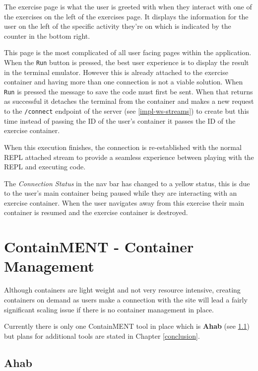 The exercise page is what the user is greeted with when they interact with one of the exercises on the left of the exercises page. It displays the information for the user on the left of the specific activity they're on which is indicated by the counter in the bottom right. 

This page is the most complicated of all user facing pages within the application. When the \texttt{Run} button is pressed, the best user experience is to display the result in the terminal emulator. However this is already attached to the exercise container and having more than one connection is not a viable solution. When \texttt{Run} is pressed the message to save the code must first be sent. When that returns as successful it detaches the terminal from the container and makes a new request to the \texttt{/connect} endpoint of the server (see \ref{impl-ws-streams}) to create but this time instead of passing the ID of the user's container it passes the ID of the exercise container.

When this execution finishes, the connection is re-established with the normal REPL attached stream to provide a seamless experience between playing with the REPL and executing code.

The \textit{Connection Status} in the nav bar has changed to a yellow status, this is due to the user's main container being paused while they are interacting with an exercise container. When the user navigates away from this exercise their main container is resumed and the exercise container is destroyed. 

\section{ContainMENT - Container Management} \label{impl-containment}

Although containers are light weight and not very resource intensive, creating containers on demand as users make a connection with the site will lead a fairly significant scaling issue if there is no container management in place.

Currently there is only one ContainMENT tool in place which is \textbf{Ahab} (see \ref{impl-ahab}) but plans for additional tools are stated in Chapter \ref{conclusion}.

\subsection{Ahab} \label{impl-ahab}

